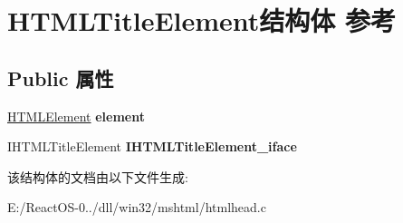 \hypertarget{struct_h_t_m_l_title_element}{}\section{H\+T\+M\+L\+Title\+Element结构体 参考}
\label{struct_h_t_m_l_title_element}
\subsection*{Public 属性}
\begin{DoxyCompactItemize}
\item 
\mbox{\label{struct_h_t_m_l_title_element_a616575f5e898c0f85f4da7914ef51853}} 
\hyperlink{struct_h_t_m_l_element}{H\+T\+M\+L\+Element} {\bfseries element}
\item 
\mbox{\label{struct_h_t_m_l_title_element_ac4c86ab6bab4b280bf97de841689b603}} 
I\+H\+T\+M\+L\+Title\+Element {\bfseries I\+H\+T\+M\+L\+Title\+Element\+\_\+iface}
\end{DoxyCompactItemize}


该结构体的文档由以下文件生成\+:\begin{DoxyCompactItemize}
\item 
E\+:/\+React\+O\+S-\/0../dll/win32/mshtml/htmlhead.\+c\end{DoxyCompactItemize}
